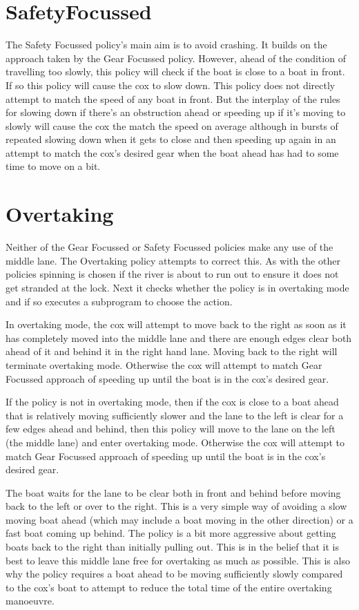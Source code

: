\section{SafetyFocussed}

The Safety Focussed policy's main aim is to avoid crashing. It builds on the approach taken by the Gear Focussed policy. However, ahead of the condition of travelling too slowly, this policy will check if the boat is close to a boat in front. If so this policy will cause the cox to slow down. This policy does not directly attempt to match the speed of any boat in front. But the interplay of the rules for slowing down if there's an obstruction ahead or speeding up if it's moving to slowly will cause the cox the match the speed on average although in bursts of repeated slowing down when it gets to close and then speeding up again in an attempt to match the cox's desired gear when the boat ahead has had to some time to move on a bit.

\section{Overtaking}

Neither of the Gear Focussed or Safety Focussed policies make any use of the middle lane. The Overtaking policy  attempts to correct this. As with the other policies spinning is chosen if the river is about to run out to ensure it does not get stranded at the lock. Next it checks whether the policy is in overtaking mode and if so executes a subprogram to choose the action.

In overtaking mode, the cox will attempt to move back to the right as soon as it has completely moved into the middle lane and there are enough edges clear both ahead of it and behind it in the right hand lane. Moving back to the right will terminate overtaking mode. Otherwise the cox will attempt to match Gear Focussed approach of speeding up until the boat is in the cox's desired gear.

If the policy is not in overtaking mode, then if the cox is close to a boat ahead that is relatively moving sufficiently slower and the lane to the left is clear for a few edges ahead and behind, then this policy will move to the lane on the left (the middle lane) and enter overtaking mode. Otherwise the cox will attempt to match Gear Focussed approach of speeding up until the boat is in the cox's desired gear.

The boat waits for the lane to be clear both in front and behind before moving back to the left or over to the right. This is a very simple way of avoiding a slow moving boat ahead (which may include a boat moving in the other direction) or a fast boat coming up behind. The policy is a bit more aggressive about getting boats back to the right than initially pulling out. This is in the belief that it is best to leave this middle lane free for overtaking as much as possible. This is also why the policy requires a boat ahead to be moving sufficiently slowly compared to the cox's boat to attempt to reduce the total time of the entire overtaking manoeuvre.